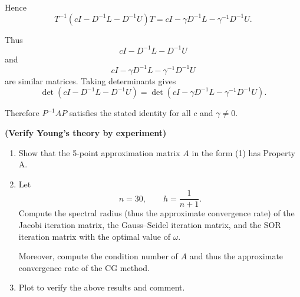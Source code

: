 \documentclass{ctexart}
\begin{document}
\begin{solution}
  Hence
  \[
    T^{-1}
    \left(
      cI-D^{-1}L-D^{-1}U
    \right)
    T
    =
    cI-\gamma D^{-1}L-\gamma^{-1}D^{-1}U.
  \]

  Thus
  \[
    cI-D^{-1}L-D^{-1}U
  \]
  and
  \[
    cI-\gamma D^{-1}L-\gamma^{-1}D^{-1}U
  \]
  are similar matrices. Taking determinants gives
  \[
    \det\!\left(cI-D^{-1}L-D^{-1}U\right)
    =
    \det\!\left(cI-\gamma D^{-1}L-\gamma^{-1}D^{-1}U\right).
  \]

  Therefore $P^{-1}AP$ satisfies the stated identity for all
  $c$ and $\gamma\neq0$.
\end{solution}
\begin{problem}\label{pro:6}
  \textbf{(Verify Young's theory by experiment)}

  \begin{enumerate}
    \item[(a)]
      Show that the 5-point approximation matrix $A$ in the form (1)
      has Property A.

    \item[(b)]
      Let
      \[
        n=30,
        \qquad
        h=\frac{1}{n+1}.
      \]
      Compute the spectral radius (thus the approximate convergence rate)
      of the Jacobi iteration matrix, the Gauss--Seidel iteration matrix,
      and the SOR iteration matrix with the optimal value of $\omega$.

      Moreover, compute the condition number of $A$ and thus the
      approximate convergence rate of the CG method.

    \item[(c)]
      Plot to verify the above results and comment.
  \end{enumerate}
\end{problem}
\end{document}
